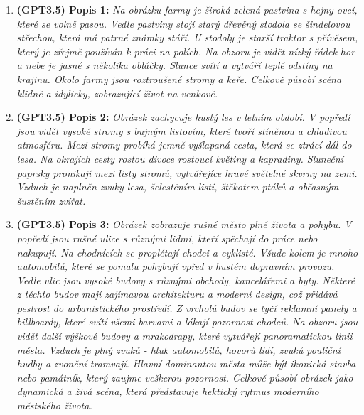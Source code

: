 \begin{enumerate}
	\item \textbf{(GPT3.5) Popis 1:} \emph{Na obrázku farmy je široká zelená pastvina s hejny ovcí, které se volně pasou. Vedle pastviny stojí starý dřevěný stodola se šindelovou střechou, která má patrné známky stáří. U stodoly je starší traktor s přívěsem, který je zřejmě používán k práci na polích. Na obzoru je vidět nízký řádek hor a nebe je jasné s několika obláčky. Slunce svítí a vytváří teplé odstíny na krajinu. Okolo farmy jsou roztroušené stromy a keře. Celkově působí scéna klidně a idylicky, zobrazující život na venkově.}
	\item \textbf{(GPT3.5) Popis 2:} \emph{Obrázek zachycuje hustý les v letním období. V popředí jsou vidět vysoké stromy s bujným listovím, které tvoří stíněnou a chladivou atmosféru. Mezi stromy probíhá jemně vyšlapaná cesta, která se ztrácí dál do lesa. Na okrajích cesty rostou divoce rostoucí květiny a kapradiny. Sluneční paprsky pronikají mezi listy stromů, vytvářejíce hravé světelné skvrny na zemi. Vzduch je naplněn zvuky lesa, šelestěním listí, štěkotem ptáků a občasným šustěním zvířat.}
	\item \textbf{(GPT3.5) Popis 3:} \emph{Obrázek zobrazuje rušné město plné života a pohybu. V popředí jsou rušné ulice s různými lidmi, kteří spěchají do práce nebo nakupují. Na chodnících se proplétají chodci a cyklisté. Všude kolem je mnoho automobilů, které se pomalu pohybují vpřed v hustém dopravním provozu.
		      Vedle ulic jsou vysoké budovy s různými obchody, kancelářemi a byty. Některé z těchto budov mají zajímavou architekturu a moderní design, což přidává pestrost do urbanistického prostředí. Z vrcholů budov se tyčí reklamní panely a billboardy, které svítí všemi barvami a lákají pozornost chodců.
		      Na obzoru jsou vidět další výškové budovy a mrakodrapy, které vytvářejí panoramatickou linii města. Vzduch je plný zvuků - hluk automobilů, hovorů lidí, zvuků pouliční hudby a zvonění tramvají.
		      Hlavní dominantou města může být ikonická stavba nebo památník, který zaujme veškerou pozornost. Celkově působí obrázek jako dynamická a živá scéna, která představuje hektický rytmus moderního městského života.}
\end{enumerate}
